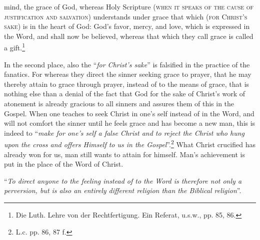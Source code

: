 mind, the grace of God, whereas Holy Scripture {\scriptsize\textsc{(when it speaks of the cause of justification and salvation)}} understands under grace that which {\scriptsize\textsc{(for Christ’s sake)}} is in the heart of God: God’s favor, mercy, and love, which is expressed in the Word, and shall now be believed, whereas that which they call grace is called a gift.\footnote{Die Luth. Lehre von der Rechtfertigung.  Ein Referat, u.s.w., pp. 85, 86.}

                In the second place, also the “\textit{for Christ’s sake}” is falsified in the practice of the fanatics.  For whereas they direct the sinner seeking grace to prayer, that he may thereby attain to grace through prayer, instead of to the means of grace, that is nothing else than a denial of the fact that God for the sake of Christ’s work of atonement is already gracious to all sinners and assures them of this in the Gospel.  When one teaches to seek Christ in one’s self instead of in the Word, and will not comfort the sinner until he feels grace and has become a new man, this is indeed to “\textit{make for one’s self a false Christ and to reject the Christ who hung upon the cross and offers Himself to us in the Gospel}”.\footnote{L.c. pp. 86, 87 f.}  What Christ crucified has already won for us, man still wants to attain for himself.  Man’s achievement is put in the place of the Word of Christ.  \begin{displayquote}“\textit{To direct anyone to the feeling instead of to the Word is therefore not only a perversion, but is also an entirely different religion than the Biblical religion}”.\end{displayquote}

